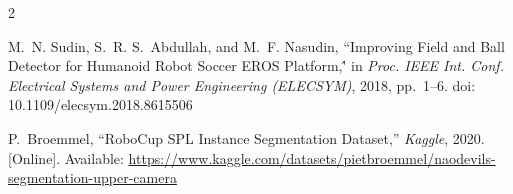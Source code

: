 \documentclass[journal]{IEEEtran}
\begin{document}
\begin{thebibliography}{2}

M.~N. Sudin, S.~R. S.~Abdullah, and M.~F. Nasudin,
``Improving Field and Ball Detector for Humanoid Robot Soccer EROS Platform,\''
in \emph{Proc. IEEE Int. Conf. Electrical Systems and Power Engineering (ELECSYM)},
2018, pp.~1--6. doi: 10.1109/elecsym.2018.8615506

P.~Broemmel,
``RoboCup SPL Instance Segmentation Dataset,''
\textit{Kaggle}, 2020.
[Online]. Available: \url{https://www.kaggle.com/datasets/pietbroemmel/naodevils-segmentation-upper-camera}

\end{thebibliography}

% 










\end{document}
